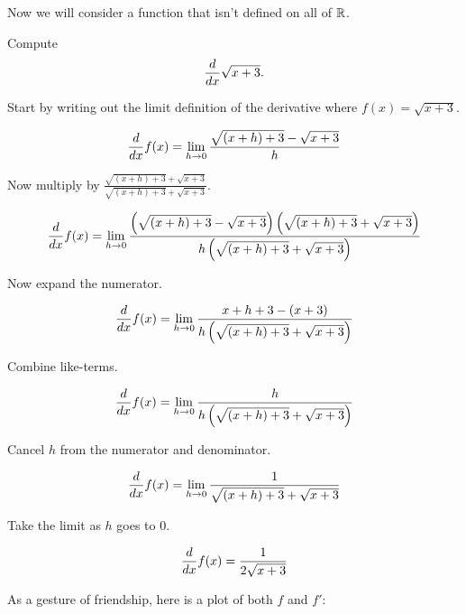 \documentclass{ximera}
\begin{document}
Now we will consider a function that isn't defined on all of $\mathbb R$.

\begin{example}
Compute 
\[
\frac{d}{dx} \sqrt{x+3}.
\]

Start by writing out the limit definition of the derivative where
$f(x) = \sqrt{x+3}$.
\begin{freeResponse}[given]
\[
\frac{d}{dx} f(x) = \lim_{h\to 0}\frac{\sqrt{(x+h)+3} - \sqrt{x+3}}{h}
\]
\end{freeResponse}
Now multiply by $\frac{\sqrt{(x+h)+3} + \sqrt{x+3}}{\sqrt{(x+h)+3} + \sqrt{x+3}}$.
\begin{freeResponse}[given]
\[
\frac{d}{dx} f(x) = \lim_{h\to 0}\frac{\left(\sqrt{(x+h)+3} - \sqrt{x+3}\right)\left(\sqrt{(x+h)+3} + \sqrt{x+3}\right)}{h\left(\sqrt{(x+h)+3} + \sqrt{x+3}\right)}
\]
\end{freeResponse}
Now expand the numerator.
\begin{freeResponse}[given]
\[
\frac{d}{dx} f(x) = \lim_{h\to 0}\frac{x+h+3 - (x+3)}{h\left(\sqrt{(x+h)+3} + \sqrt{x+3}\right)}
\]
\end{freeResponse}
Combine like-terms.
\begin{freeResponse}[given]
\[
\frac{d}{dx} f(x) = \lim_{h\to 0}\frac{h}{h\left(\sqrt{(x+h)+3} + \sqrt{x+3}\right)}
\]
\end{freeResponse}
Cancel $h$ from the numerator and denominator.
\begin{freeResponse}[given]
\[
\frac{d}{dx} f(x) = \lim_{h\to 0}\frac{1}{\sqrt{(x+h)+3} + \sqrt{x+3}}
\]
\end{freeResponse}
Take the limit as $h$ goes to $0$. 
\begin{freeResponse}[given]
\[
\frac{d}{dx} f(x) = \frac{1}{2\sqrt{x+3}}
\]
\end{freeResponse}
As a gesture of friendship, here is a plot of both $f$ and $f'$:
\begin{image}
\end{image}
\end{example}
\end{document}

